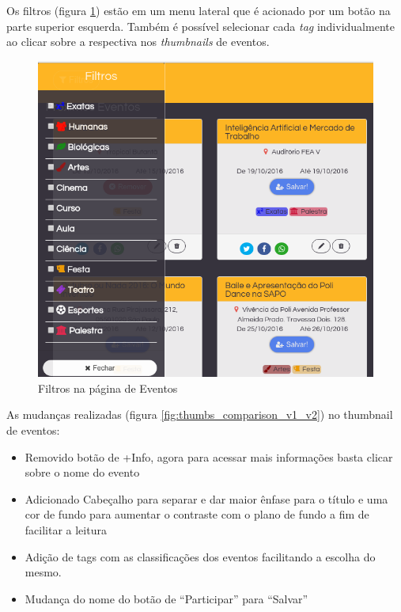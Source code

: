 \par Os filtros (figura \ref{fig:events_pagev2_filters}) estão em um menu lateral que é acionado por um botão na parte superior esquerda. Também é possível selecionar cada \emph{tag} individualmente ao clicar sobre a respectiva nos \emph{thumbnails} de eventos.
        \begin{figure}[htb]
		\includegraphics[width=15cm]{figuras/events_pagev2_filters}
		\caption{\label{fig:events_pagev2_filters} Filtros na página de Eventos}
		\end{figure}
As mudanças realizadas (figura \ref{fig:thumbs_comparison_v1_v2}) no thumbnail de eventos:
\begin{itemize}
\item Removido botão de +Info, agora para acessar mais informações basta clicar sobre o nome do evento
\item Adicionado Cabeçalho para separar e dar maior ênfase para o título e uma cor de fundo para aumentar o contraste com o plano de fundo a fim de facilitar a leitura
\item Adição de tags com as classificações dos eventos facilitando a escolha do mesmo.
\item Mudança do nome do botão de ``Participar'' para ``Salvar''
\end{itemize}

